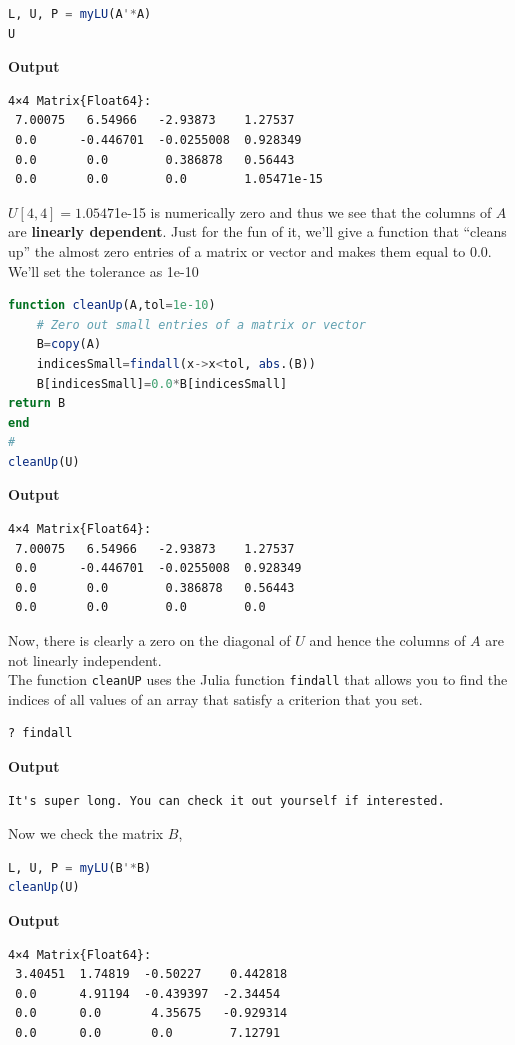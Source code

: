 \begin{lstlisting}[language=Julia,style=mystyle]
L, U, P = myLU(A'*A)
U
\end{lstlisting}
\textbf{Output} 
\begin{verbatim}
4×4 Matrix{Float64}:
 7.00075   6.54966   -2.93873    1.27537
 0.0      -0.446701  -0.0255008  0.928349
 0.0       0.0        0.386878   0.56443
 0.0       0.0        0.0        1.05471e-15
\end{verbatim}

$U[4,4]=1.0547$1e-15 is numerically zero and thus we see that the columns of $A$ are \textbf{linearly dependent}. Just for the fun of it, we'll give a function that ``cleans up'' the almost zero entries of a matrix or vector and makes them equal to 0.0. We'll set the tolerance as 1e-10\\

\begin{lstlisting}[language=Julia,style=mystyle]
function cleanUp(A,tol=1e-10)
    # Zero out small entries of a matrix or vector
    B=copy(A)
    indicesSmall=findall(x->x<tol, abs.(B))
    B[indicesSmall]=0.0*B[indicesSmall]
return B
end
#
cleanUp(U)
\end{lstlisting}
\textbf{Output} 
\begin{verbatim}
4×4 Matrix{Float64}:
 7.00075   6.54966   -2.93873    1.27537
 0.0      -0.446701  -0.0255008  0.928349
 0.0       0.0        0.386878   0.56443
 0.0       0.0        0.0        0.0
\end{verbatim}
Now, there is clearly a zero on the diagonal of $U$ and hence the columns of $A$ are not linearly independent. \\

The function \texttt{cleanUP} uses the Julia function \texttt{findall} that allows you to find the indices of all values of an array that satisfy a criterion that you set. \\

\begin{lstlisting}[language=Julia,style=mystyle]
? findall
\end{lstlisting}
\textbf{Output} 
\begin{verbatim}
It's super long. You can check it out yourself if interested. 
\end{verbatim}

Now we check the matrix $B$,

\begin{lstlisting}[language=Julia,style=mystyle]
L, U, P = myLU(B'*B)
cleanUp(U)
\end{lstlisting}
\textbf{Output} 
\begin{verbatim}
4×4 Matrix{Float64}:
 3.40451  1.74819  -0.50227    0.442818
 0.0      4.91194  -0.439397  -2.34454
 0.0      0.0       4.35675   -0.929314
 0.0      0.0       0.0        7.12791
\end{verbatim}

